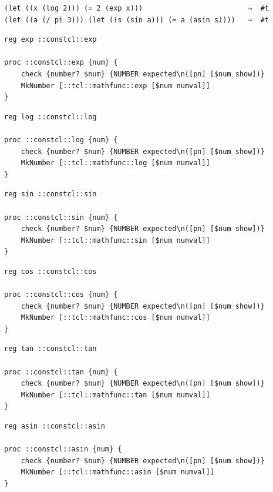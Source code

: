 \documentclass[twoside,9pt]{report}
\begin{document}
\noindent\makebox[\linewidth]{\rule{\linewidth}{0.4pt}}
\begin{lstlisting}
(let ((x (log 2))) (= 2 (exp x)))                         ⇒  #t
(let ((a (/ pi 3))) (let ((s (sin a))) (= a (asin s))))   ⇒  #t
\end{lstlisting}
\noindent\makebox[\linewidth]{\rule{\linewidth}{0.4pt}}
\noindent\makebox[\linewidth]{\rule{\linewidth}{0.4pt}}
\begin{lstlisting}
reg exp ::constcl::exp
 
proc ::constcl::exp {num} {
    check {number? $num} {NUMBER expected\n([pn] [$num show])}
    MkNumber [::tcl::mathfunc::exp [$num numval]]
}
\end{lstlisting}
\noindent\makebox[\linewidth]{\rule{\linewidth}{0.4pt}}
\noindent\makebox[\linewidth]{\rule{\linewidth}{0.4pt}}
\begin{lstlisting}
reg log ::constcl::log
 
proc ::constcl::log {num} {
    check {number? $num} {NUMBER expected\n([pn] [$num show])}
    MkNumber [::tcl::mathfunc::log [$num numval]]
}
\end{lstlisting}
\noindent\makebox[\linewidth]{\rule{\linewidth}{0.4pt}}
\noindent\makebox[\linewidth]{\rule{\linewidth}{0.4pt}}
\begin{lstlisting}
reg sin ::constcl::sin
 
proc ::constcl::sin {num} {
    check {number? $num} {NUMBER expected\n([pn] [$num show])}
    MkNumber [::tcl::mathfunc::sin [$num numval]]
}
\end{lstlisting}
\noindent\makebox[\linewidth]{\rule{\linewidth}{0.4pt}}
\noindent\makebox[\linewidth]{\rule{\linewidth}{0.4pt}}
\begin{lstlisting}
reg cos ::constcl::cos
 
proc ::constcl::cos {num} {
    check {number? $num} {NUMBER expected\n([pn] [$num show])}
    MkNumber [::tcl::mathfunc::cos [$num numval]]
}
\end{lstlisting}
\noindent\makebox[\linewidth]{\rule{\linewidth}{0.4pt}}
\noindent\makebox[\linewidth]{\rule{\linewidth}{0.4pt}}
\begin{lstlisting}
reg tan ::constcl::tan
 
proc ::constcl::tan {num} {
    check {number? $num} {NUMBER expected\n([pn] [$num show])}
    MkNumber [::tcl::mathfunc::tan [$num numval]]
}
\end{lstlisting}
\noindent\makebox[\linewidth]{\rule{\linewidth}{0.4pt}}
\noindent\makebox[\linewidth]{\rule{\linewidth}{0.4pt}}
\begin{lstlisting}
reg asin ::constcl::asin
 
proc ::constcl::asin {num} {
    check {number? $num} {NUMBER expected\n([pn] [$num show])}
    MkNumber [::tcl::mathfunc::asin [$num numval]]
}
\end{lstlisting}
\end{document}
